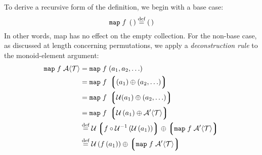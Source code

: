 
To derive a recursive form of the definition, we begin with a base case:
\begin{equation}
  \mathtt{map}\;f\;\left(\,\right)\overset{\text{def}}{=}\left(\,\right)
\end{equation}
In other words, map has no effect on the empty collection. For the non-base case, as discussed at length concerning permutations, we apply a \emph{deconstruction rule} to the monoid-element argument:
\begin{align}
  \mathtt{map}\;f\;\mathcal{A}\langle\mathcal{T}\rangle
     &=\mathtt{map}\;f\;(a_1,a_2,\ldots)\nonumber\\
  {} &= \mathtt{map}\;f\;\left\lgroup (a_1)\oplus(a_2,\ldots)\right\rgroup
         \nonumber\\
  {} &= \mathtt{map}\;f\;\left\lgroup \mathcal{U}(a_1)\oplus(a_2,\ldots)\right\rgroup
         \nonumber\\
  {} &= \mathtt{map}\;f\;\left\lgroup
     \mathcal{U}\left(a_1\right)\oplus{\mathcal{A}'\langle\mathcal{T}\rangle}
     \right\rgroup \nonumber\\
  {} &\overset{\text{def}}{=}\mathcal{U}\left\lgroup
     f\circ\mathcal{U}^{-1}\left(
     \mathcal{U}\left(a_1\right)\right)\right\rgroup\oplus
     \left\lgroup\mathtt{map}\;f\;{\mathcal{A}'\langle\mathcal{T}\rangle}\right\rgroup
     \label{def:mapdefone}\\
  {} &\overset{\text{def}}{=}\mathcal{U}\left(f\left(a_1\right)\right)\oplus
     \left\lgroup\mathtt{map}\;f\;{\mathcal{A}'\langle\mathcal{T}\rangle}\right\rgroup
     \label{def:mapdeftwo}
\end{align}
